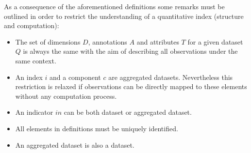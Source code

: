 As a consequence of the aforementioned definitions some remarks must be outlined in order to restrict the understanding of 
a quantitative index (structure and computation):
\begin{itemize}
 \item The set of dimensions $D$, annotations $A$ and attributes $T$ for a given dataset $Q$ is always the same with the aim of describing all observations under 
 the same context.
 \item An index $i$ and a component $c$ are aggregated datasets. Nevertheless this restriction is relaxed if observations can be directly mapped to 
 these elements without any computation process.
 \item An indicator $in$ can be both dataset or aggregated dataset.
 \item All elements in definitions must be uniquely identified. 
 \item An aggregated dataset is also a dataset.
\end{itemize}

